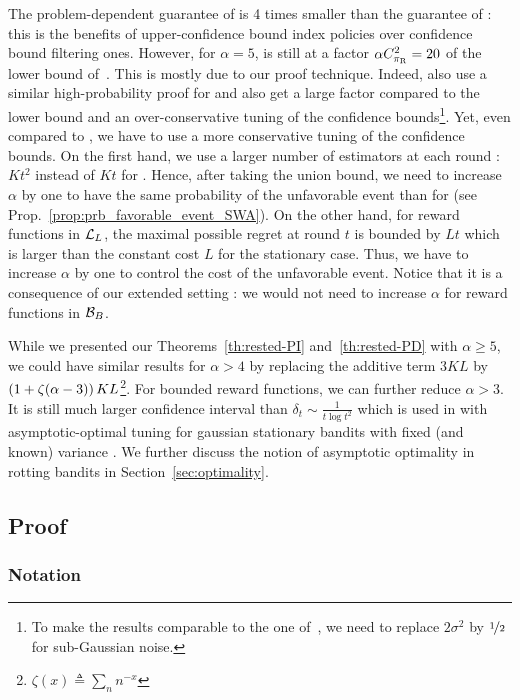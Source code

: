 \begin{remark}
\label{rem:pd-optimality}
The problem-dependent guarantee of \RUCB is 4 times smaller than the guarantee of \FEWA : this is the benefits of upper-confidence bound index policies over confidence bound filtering ones. However, for $\alpha = 5$, \RUCB is still at a factor $\alpha C_{\pi_{\rm R}}^2 = 20$ of the lower bound of~\citet{lai1985asymptotically}. This is mostly due to our proof technique. Indeed, \citet{auer2002finite} also use a similar high-probability proof for \UCBone and also get a large factor compared to the lower bound and an over-conservative tuning of the confidence bounds\footnote{To make the results comparable to the one of~\citet{auer2002finite}, we need to replace $2\sigma^2$ by $\nicefrac{1}{2}$ for sub-Gaussian noise.}. Yet, even compared to \UCBone, we have to use a more conservative tuning of the confidence bounds. On the first hand, we use a larger number of estimators at each round : $Kt^2$ instead of $Kt$ for \UCB. Hence, after taking the union bound, we need to increase $\alpha$ by one to have the same probability of the unfavorable event than for \UCBone (see Prop.~\ref{prop:prb_favorable_event_SWA}). On the other hand, for reward functions in $\mathcal{L}_L$, the maximal possible regret at round $t$ is bounded by $Lt$ which is larger than the constant cost $L$ for the stationary case. Thus, we have to increase $\alpha$ by one to control the cost of the unfavorable event. Notice that it is a consequence of our extended setting : we would not need to increase $\alpha$ for reward functions in $\mathcal{B}_{B}$.

While we presented our Theorems~\ref{th:rested-PI} and~\ref{th:rested-PD} with $\alpha \geq 5$, we could have similar results for $\alpha > 4$ by replacing the additive term $3KL$ by $\left(1 + \zeta(\alpha-3)\right)KL$\footnote{$\zeta(x) \triangleq \sum_n n^{-x}$}. For bounded reward functions, we can further reduce $\alpha >3$. It is still much larger confidence interval than $\delta_t \sim \frac{1}{t\log{t}^2}$ which is used in \UCB with asymptotic-optimal tuning for gaussian stationary bandits with fixed (and known) variance \citep{lattimore2020banditbook}. We further discuss the notion of asymptotic optimality in rotting bandits in Section~\ref{sec:optimality}. %
\end{remark}
%
\subsection{Proof}
\subsubsection*{Notation}
